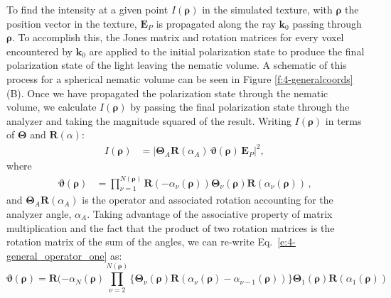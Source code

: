 To find the intensity at a given point $I(\bm{\rho})$ in the simulated texture, with $\mathbf{\rho}$ the position vector in the texture, $\mathbf{E}_P$ is propagated along the ray $\mathbf{k}_0$ passing through $\bm{\rho}$.
To accomplish this, the Jones matrix and rotation matrices for every voxel encountered by $\mathbf{k}_0$ are applied to the initial polarization state to produce the final polarization state of the light leaving the nematic volume.
A schematic of this process for a spherical nematic volume can be seen in Figure \ref{f:4-generalcoords}(B).
Once we have propagated the polarization state through the nematic volume, we calculate $I(\bm{\rho})$ by passing the final polarization state through the analyzer and taking the magnitude squared of the result.
Writing $I(\bm{\rho})$ in terms of $\bm{\Theta}$ and $\mathbf{R}(\alpha)$:
\begin{align}
I(\bm{\rho}) &= |\bm{\Theta}_A \mathbf{R}(\alpha_A)\, \bm{\vartheta}(\bm{\rho}) \, \mathbf{E}_P|^2, \, \label{e:4-Intensity}
\end{align}
where
\begin{align}
        \bm{\vartheta}(\bm{\rho}) &=  \prod\limits_{\nu = 1}^{N(\bm{\rho})}
        \!\mathbf{R}(-\alpha_{\nu}(\bm{\rho})) \bm{\Theta}_{\nu}(\bm{\rho}) \mathbf{R}(\alpha_{\nu}(\bm{\rho}))\,, \label{e:4-general_operator_one}
\end{align}
and $\bm{\Theta}_A \mathbf{R}(\alpha_A)$ is the operator and associated rotation accounting for the analyzer angle, $\alpha_A$.
Taking advantage of the associative property of matrix multiplication and the fact that the product of two rotation matrices is the rotation matrix of the sum of the angles, we can re-write Eq.~\ref{e:4-general_operator_one} as:
\begin{equation}
\bm{\vartheta}(\bm{\rho}) =  \mathbf{R}(-\alpha_{N}(\bm{\rho})
 \prod\limits_{\nu = 2}^{N(\bm{\rho})}
 \!\Big \{ \bm{\Theta}_{\nu}(\bm{\rho}) \mathbf{R}(\alpha_{\nu}(\bm{\rho})-\alpha_{\nu-1}(\bm{\rho})) \Big \}
 \bm{\Theta}_{1}(\bm{\rho}) \mathbf{R}(\alpha_{1}(\bm{\rho}))\,
\end{equation}

